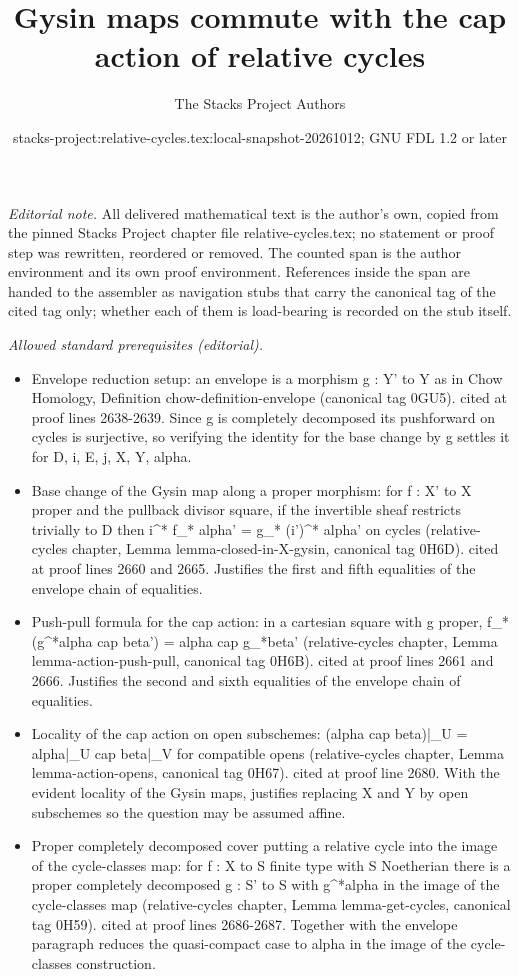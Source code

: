 \documentclass{stacks-project}
\title{Gysin maps commute with the cap action of relative cycles}
\author{The Stacks Project Authors}
\date{stacks-project:relative-cycles.tex:local-snapshot-20261012; GNU FDL 1.2 or later}
\theoremstyle{plain}
\theoremstyle{definition}
\theoremstyle{remark}
\numberwithin{equation}{subsection}
\begin{document}
\maketitle
\setcounter{subsection}{1}
\noindent\textit{Editorial note.} All delivered mathematical text is the author's own, copied from the pinned Stacks Project chapter file relative-cycles.tex; no statement or proof step was rewritten, reordered or removed. The counted span is the author environment and its own proof environment. References inside the span are handed to the assembler as navigation stubs that carry the canonical tag of the cited tag only; whether each of them is load-bearing is recorded on the stub itself.\par\medskip
\noindent\textit{Allowed standard prerequisites (editorial).}\begin{itemize}
\item Envelope reduction setup: an envelope is a morphism g : Y' to Y as in Chow Homology, Definition chow-definition-envelope (canonical tag 0GU5). cited at proof lines 2638-2639. Since g is completely decomposed its pushforward on cycles is surjective, so verifying the identity for the base change by g settles it for D, i, E, j, X, Y, alpha.
\item Base change of the Gysin map along a proper morphism: for f : X' to X proper and the pullback divisor square, if the invertible sheaf restricts trivially to D then i\textasciicircum{}* f\_* alpha' = g\_* (i')\textasciicircum{}* alpha' on cycles (relative-cycles chapter, Lemma lemma-closed-in-X-gysin, canonical tag 0H6D). cited at proof lines 2660 and 2665. Justifies the first and fifth equalities of the envelope chain of equalities.
\item Push-pull formula for the cap action: in a cartesian square with g proper, f\_*(g\textasciicircum{}*alpha cap beta') = alpha cap g\_*beta' (relative-cycles chapter, Lemma lemma-action-push-pull, canonical tag 0H6B). cited at proof lines 2661 and 2666. Justifies the second and sixth equalities of the envelope chain of equalities.
\item Locality of the cap action on open subschemes: (alpha cap beta)|\_U = alpha|\_U cap beta|\_V for compatible opens (relative-cycles chapter, Lemma lemma-action-opens, canonical tag 0H67). cited at proof line 2680. With the evident locality of the Gysin maps, justifies replacing X and Y by open subschemes so the question may be assumed affine.
\item Proper completely decomposed cover putting a relative cycle into the image of the cycle-classes map: for f : X to S finite type with S Noetherian there is a proper completely decomposed g : S' to S with g\textasciicircum{}*alpha in the image of the cycle-classes map (relative-cycles chapter, Lemma lemma-get-cycles, canonical tag 0H59). cited at proof lines 2686-2687. Together with the envelope paragraph reduces the quasi-compact case to alpha in the image of the cycle-classes construction.

\end{itemize}
\end{document}
